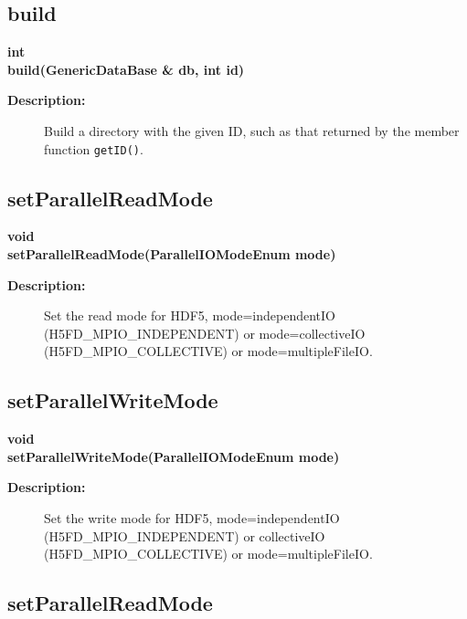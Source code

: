 \subsection{build}
 
\begin{flushleft} \textbf{%
int  \\ 
\settowidth{\GenericDataBaseIncludeArgIndent}{build(}%
build(GenericDataBase \& db, int id)
}\end{flushleft}
\begin{description}
\item[{\bf Description:}]  
    Build a directory with the given ID, such as that returned by the member function {\tt getID()}.
\end{description}
\subsection{setParallelReadMode}
 
\begin{flushleft} \textbf{%
void  \\ 
\settowidth{\GenericDataBaseIncludeArgIndent}{setParallelReadMode(}%
setParallelReadMode(ParallelIOModeEnum mode)
}\end{flushleft}
\begin{description}
\item[{\bf Description:}]  
   Set the read mode for HDF5, mode=independentIO (H5FD\_MPIO\_INDEPENDENT) or
      mode=collectiveIO (H5FD\_MPIO\_COLLECTIVE) or mode=multipleFileIO.
 
\end{description}
\subsection{setParallelWriteMode}
 
\begin{flushleft} \textbf{%
void  \\ 
\settowidth{\GenericDataBaseIncludeArgIndent}{setParallelWriteMode(}%
setParallelWriteMode(ParallelIOModeEnum mode)
}\end{flushleft}
\begin{description}
\item[{\bf Description:}]  
   Set the write mode for HDF5, mode=independentIO (H5FD\_MPIO\_INDEPENDENT) or
      collectiveIO (H5FD\_MPIO\_COLLECTIVE) or mode=multipleFileIO.
\end{description}
\subsection{setParallelReadMode}
 

